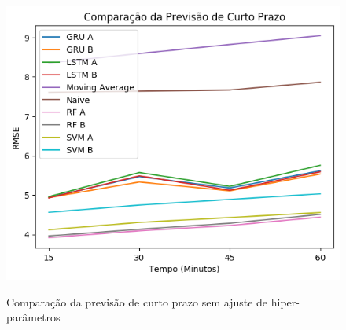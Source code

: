  \begin{figure}[H]
    \centering
    \includegraphics[scale=0.9]{monography/img/comparisons/comparacao_da_previsao_de_curto_prazo_rmse.png}
    \label{figure:pred_no_tuning}
    \caption{Comparação da previsão de curto prazo sem ajuste de hiper-parâmetros}
\end{figure}

